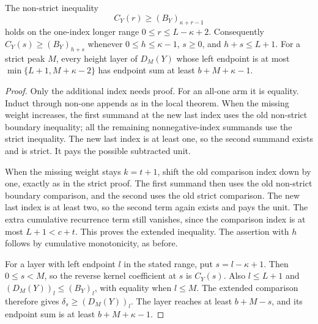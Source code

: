 \begin{proposition}
The non-strict inequality
\[
 C_Y(r)\ge(B_Y)_{\kappa+r-1}
\]
holds on the one-index longer range $0\le r\le L-\kappa+2$.
Consequently $C_Y(s)\ge(B_Y)_{h+s}$ whenever
$0\le h\le\kappa-1$, $s\ge0$, and $h+s\le L+1$.
For a strict peak $M$, every height layer of $D_M(Y)$ whose
left endpoint is at most
$\min\{L+1,M+\kappa-2\}$ has endpoint sum at least
$b+M+\kappa-1$.
\end{proposition}
\begin{proof}
Only the additional index needs proof. For an all-one arm it
is equality. Induct through non-one appends as in the local
theorem. When the missing weight increases, the first summand
at the new last index uses the old non-strict boundary inequality;
all the remaining nonnegative-index summands use the strict
inequality. The new last index is at least one, so the second
summand exists and is strict. It pays the possible subtracted unit.

When the missing weight stays $k=t+1$, shift the old comparison
index down by one, exactly as in the strict proof. The first
summand then uses the old non-strict boundary comparison, and
the second uses the old strict comparison. The new last index
is at least two, so the second term again exists and pays the
unit. The extra cumulative recurrence term still vanishes,
since the comparison index is at most $L+1<c+t$.
This proves the extended inequality. The assertion with $h$
follows by cumulative monotonicity, as before.

For a layer with left endpoint $l$ in the stated range, put
$s=l-\kappa+1$. Then $0\le s<M$, so the reverse kernel
coefficient at $s$ is $C_Y(s)$. Also $l\le L+1$ and
$(D_M(Y))_l\le(B_Y)_l$, with equality when $l\le M$.
The extended comparison therefore gives
$\delta_s\ge(D_M(Y))_l$. The layer reaches at least
$b+M-s$, and its endpoint sum is at least $b+M+\kappa-1$.
\end{proof}

